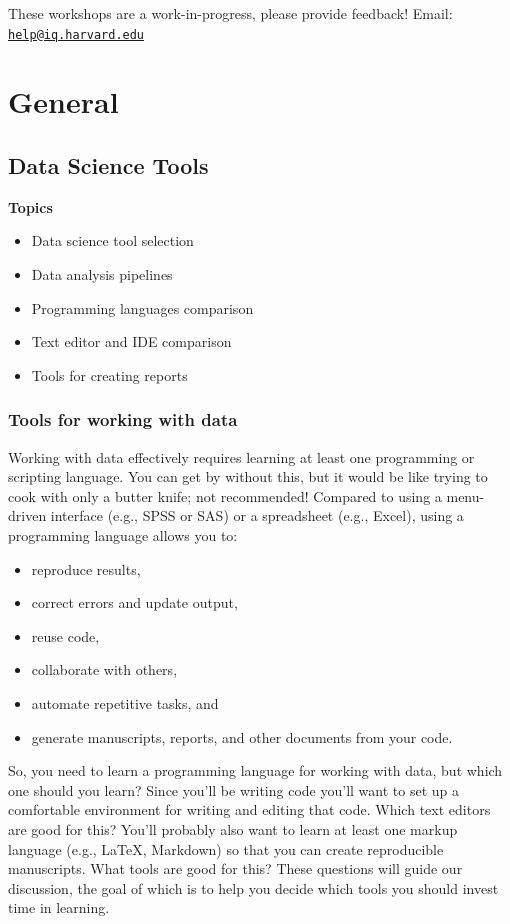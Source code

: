 \documentclass[]{book}
\providecommand{\tightlist}{%
  \setlength{\itemsep}{0pt}\setlength{\parskip}{0pt}}
\begin{document}
These workshops are a work-in-progress, please provide feedback! Email:
\href{mailto:help@iq.harvard.edu}{\nolinkurl{help@iq.harvard.edu}}

\part{General}\label{part-general}

\chapter{Data Science Tools}\label{data-science-tools}

\textbf{Topics}

\begin{itemize}
\tightlist
\item
  Data science tool selection
\item
  Data analysis pipelines
\item
  Programming languages comparison
\item
  Text editor and IDE comparison
\item
  Tools for creating reports
\end{itemize}

\section{Tools for working with data}\label{tools-for-working-with-data}

Working with data effectively requires learning at least one programming
or scripting language. You can get by without this, but it would be like
trying to cook with only a butter knife; not recommended! Compared to
using a menu-driven interface (e.g., SPSS or SAS) or a spreadsheet
(e.g., Excel), using a programming language allows you to:

\begin{itemize}
\tightlist
\item
  reproduce results,
\item
  correct errors and update output,
\item
  reuse code,
\item
  collaborate with others,
\item
  automate repetitive tasks, and
\item
  generate manuscripts, reports, and other documents from your code.
\end{itemize}

So, you need to learn a programming language for working with data, but
which one should you learn? Since you'll be writing code you'll want to
set up a comfortable environment for writing and editing that code.
Which text editors are good for this? You'll probably also want to learn
at least one markup language (e.g., LaTeX, Markdown) so that you can
create reproducible manuscripts. What tools are good for this? These
questions will guide our discussion, the goal of which is to help you
decide which tools you should invest time in learning.
\end{document}
